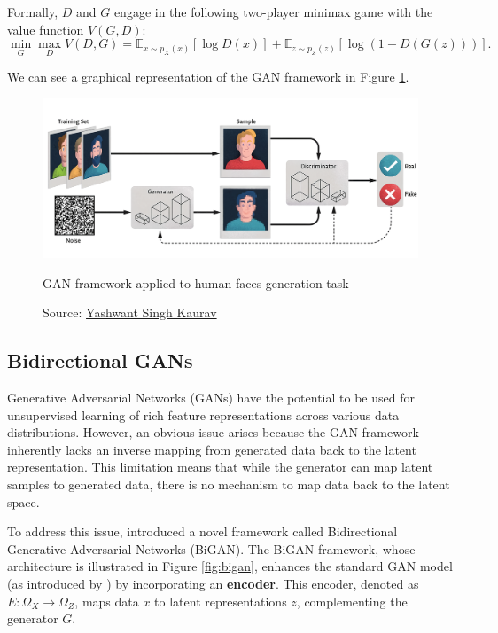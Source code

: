 Formally, \( D \) and \( G \) engage in the following
two-player minimax game with the value function \( V(G, D) \):
\begin{equation}
\min_G \max_D V(D, G) = \mathbb{E}_{x \sim p_X(x)}[\log D(x)] + \mathbb{E}_{z \sim p_Z(z)}[\log (1 - D(G(z)))].
\end{equation}

We can see a graphical representation of the GAN framework in Figure \ref{fig:gan}.
\begin{figure}[h]
    \centering
    \includegraphics[width=\textwidth]{figures/ch3/5.gan.png}
    \caption{GAN framework applied to human faces generation task}
    \vspace{-10px}
    \caption*{\scriptsize{Source: \href{https://www.linkedin.com/pulse/exploring-fascinating-realm-generative-adversarial-networks-kaurav/}{Yashwant Singh Kaurav}}}
    \label{fig:gan}
\end{figure}

\subsection{Bidirectional GANs}

Generative Adversarial Networks (GANs) have the potential to be used
for unsupervised learning of rich feature representations across various
data distributions. However, an obvious issue arises because
the GAN framework inherently lacks an inverse mapping from generated data
back to the latent representation.
This limitation means that while the generator can map latent samples
to generated data, there is no mechanism to map data back to the latent space.

To address this issue, \cite{donahue2017} introduced a novel framework
called Bidirectional Generative Adversarial Networks (BiGAN).
The BiGAN framework, whose architecture is illustrated
in Figure \ref{fig:bigan}, enhances the standard GAN model
(as introduced by \cite{goodfellow2014}) by incorporating an \textbf{encoder}.
This encoder, denoted as \( E: \Omega_X \rightarrow \Omega_Z \),
maps data \( x \) to latent representations
\( z \), complementing the generator \( G \).

